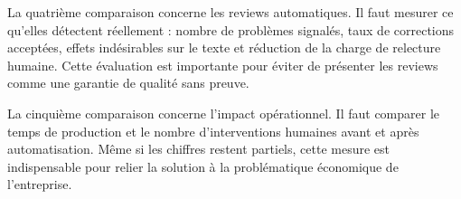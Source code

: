 La quatrième comparaison concerne les reviews automatiques. Il faut mesurer ce qu'elles
détectent réellement : nombre de problèmes signalés, taux de corrections acceptées,
effets indésirables sur le texte et réduction de la charge de relecture humaine. Cette
évaluation est importante pour éviter de présenter les reviews comme une garantie de
qualité sans preuve.

La cinquième comparaison concerne l'impact opérationnel. Il faut comparer le temps de
production et le nombre d'interventions humaines avant et après automatisation. Même si
les chiffres restent partiels, cette mesure est indispensable pour relier la solution à la
problématique économique de l'entreprise.
